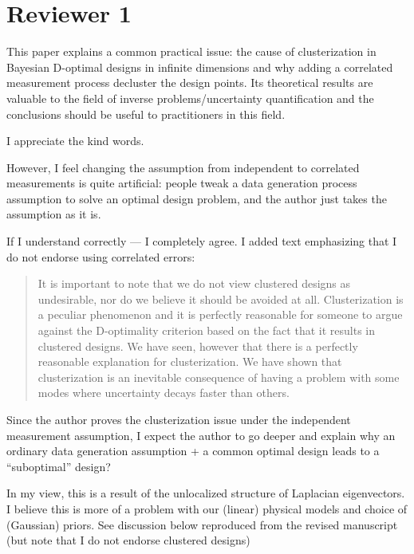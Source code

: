 \section{Reviewer 1}\label{ref1}
\RC This paper explains a common practical issue: the cause of
clusterization in Bayesian D-optimal designs in infinite dimensions
and why adding a correlated measurement process decluster the design
points. Its theoretical results are valuable to the field of inverse
problems/uncertainty quantification and the conclusions should be
useful to practitioners in this field.

\AR I appreciate the kind words.


\RC However, I feel changing the assumption from independent to correlated
measurements is quite artificial: people tweak a data generation
process assumption to solve an optimal design problem, and the author
just takes the assumption as it is.

\AR If I understand correctly --- I completely agree. I added text
emphasizing that I do not endorse using correlated errors:


\begin{quote}
  It is important to note that we do not view clustered designs as
  undesirable, nor do we believe it should be avoided at
  all. Clusterization is a peculiar phenomenon and it is perfectly
  reasonable for someone to argue against the D-optimality criterion
  based on the fact that it results in clustered designs. We have
  seen, however that there is a perfectly reasonable explanation for
  clusterization. We have shown that clusterization is an inevitable
  consequence of having a problem with some modes where uncertainty
  decays faster than others.
\end{quote}

\RC Since the author proves the clusterization issue under the independent
measurement assumption, I expect the author to go deeper and explain
why an ordinary data generation assumption + a common optimal design
leads to a “suboptimal” design?

\AR In my view, this is a result of the unlocalized structure of
Laplacian eigenvectors. I believe this is more of a problem with our
(linear) physical models and choice of (Gaussian) priors. See
discussion below reproduced from the revised manuscript (but note that
I do not endorse clustered designs)


